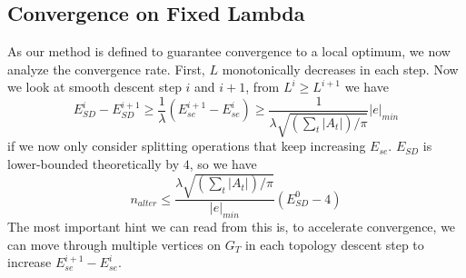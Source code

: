\subsection{Convergence on Fixed Lambda}
\label{sec:convergence}


As our method is defined to guarantee convergence to a local optimum, we now analyze the convergence rate. First, $L$ monotonically decreases in each step. Now we look at smooth descent step $i$ and $i+1$, from $L^i \geq L^{i+1}$ we have
\[ E^i_{SD} - E^{i+1}_{SD} \geq \frac{1}{\lambda} (E^{i+1}_{se} - E^i_{se}) \geq \frac{1}{\lambda\sqrt{(\sum_t |A_t|)/\pi}} |e|_{min} \]
if we now only consider splitting operations that keep increasing $E_{se}$. $E_{SD}$ is lower-bounded theoretically by $4$, so we have
\[ n_{alter} \leq \frac{\lambda\sqrt{(\sum_t |A_t|)/\pi}}{|e|_{min}} (E^0_{SD} - 4) \]
The most important hint we can read from this is, to accelerate convergence, we can move through multiple vertices on $G_T$ in each topology descent step to increase $E^{i+1}_{se} - E^i_{se}$.

 
